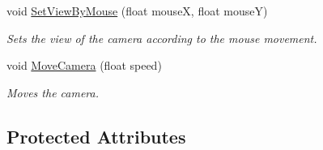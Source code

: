 \begin{CompactItemize}
void \hyperlink{class_camera_05c4a137b939bfdee2b7efea6d67d0e7}{SetViewByMouse} (float mouseX, float mouseY)
\begin{CompactList}\small\item\em Sets the view of the camera according to the mouse movement. \item\end{CompactList}\item 
void \hyperlink{class_camera_ec3a27aa4de4ad2d10d421ee2fa54223}{MoveCamera} (float speed)
\begin{CompactList}\small\item\em Moves the camera. \item\end{CompactList}\end{CompactItemize}
\subsection*{Protected Attributes}
